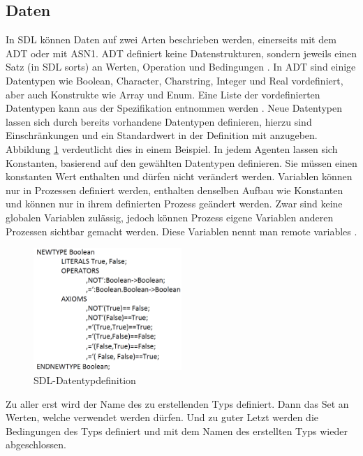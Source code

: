 \pagebreak
\subsection{Daten}
\label{ssc:Daten}
In \ac{SDL} können Daten auf zwei Arten beschrieben werden, einerseits mit dem \acs{ADT} oder mit \ac{ASN1}. \ac{ADT} definiert keine Datenstrukturen, sondern jeweils einen Satz (in \ac{SDL} sorts) an Werten, Operation und Bedingungen \cite[67]{ITUT104_2016}. In \ac{ADT} sind einige Datentypen wie Boolean, Character, Charstring, Integer und Real vordefiniert, aber auch Konstrukte wie Array und Enum. Eine Liste der vordefinierten Datentypen kann aus der Spezifikation entnommen werden \cite[47\psqq]{ITUT104_2016}. Neue Datentypen lassen sich durch bereits vorhandene Datentypen definieren, hierzu sind Einschränkungen und ein Standardwert in der Definition mit anzugeben. Abbildung \ref{fig:DatentypDef} verdeutlicht dies in einem Beispiel. In jedem Agenten lassen sich Konstanten, basierend auf den gewählten Datentypen definieren. Sie müssen einen konstanten Wert enthalten und dürfen nicht verändert werden. Variablen können nur in Prozessen definiert werden, enthalten denselben Aufbau wie Konstanten und können nur in ihrem definierten Prozess geändert werden. Zwar sind keine globalen Variablen zulässig, jedoch können Prozess eigene Variablen anderen Prozessen sichtbar gemacht werden. Diese Variablen nennt man remote variables \cite[31]{ITUT102_2016}.

\begin{figure}[h]
	\centering
	\includegraphics[width=0.5\textwidth]{Graphics/Data.png}
	\caption{SDL-Datentypdefinition}
	\label{fig:DatentypDef}
\end{figure}

Zu aller erst wird der Name des zu erstellenden Typs definiert. Dann das Set an Werten, welche verwendet werden dürfen. Und zu guter Letzt werden die Bedingungen des Typs definiert und mit dem Namen des erstellten Typs wieder abgeschlossen.

